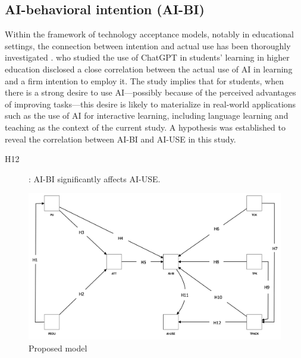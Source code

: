 \documentclass[english]{textolivre}
\begin{document}
\subsection{AI-behavioral intention (AI-BI)}\label{sec-titulo}
Within the framework of technology acceptance models, notably in educational settings, the connection between intention and actual use has been thoroughly investigated \cite{lavidas2024ai,strzelecki2024chatgpt,xiaohong2024intentions}. \textcite{strzelecki2024chatgpt} who studied the use of ChatGPT in students’ learning in higher education disclosed a close correlation between the actual use of AI in learning and a firm intention to employ it. The study implies that for students, when there is a strong desire to use AI—possibly because of the perceived advantages of improving tasks—this desire is likely to materialize in real-world applications such as the use of AI for interactive learning, including language learning and teaching as the context of the current study. A hypothesis was established to reveal the correlation between AI-BI and AI-USE in this study.

\begin{description}
    \item[H12]: AI-BI significantly affects AI-USE.
\end{description}


\begin{figure}[h!]
    \centering
    \begin{minipage}{0.75\linewidth}
    \includegraphics[width=\linewidth]{Fig1.png}
    \caption{Proposed model}
    \label{fig1}
    \end{minipage}
\end{figure}
\end{document}
